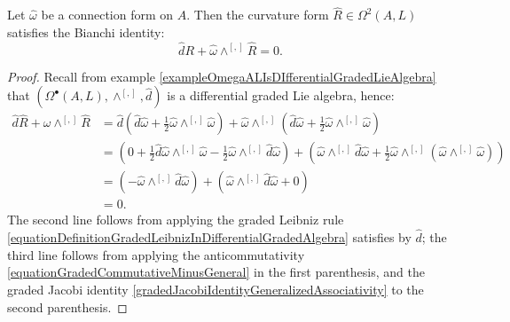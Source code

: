 \begin{proposition}\label{propositionCurvatureSatisfiesBianchi}
Let $\hat \omega$ be a connection form on $A$. Then the curvature form $\hat R \in \Omega^2(A, L)$ satisfies the Bianchi identity:
\begin{equation}
    \hat d R + \hat \omega \wedge^{[,]} \hat R = 0.
\end{equation}
\end{proposition}
\begin{proof}
Recall from example \ref{exampleOmegaALIsDIfferentialGradedLieAlgebra} that $(\Omega^\bullet(A, L), \wedge^{[,]}, \hat d)$ is a differential graded Lie algebra, hence:
\begin{align*}
    \hat d \hat  R + \hat \omega \wedge^{[,]} \hat R 
        &= \hat d(\hat d \hat \omega + \frac{1}{2}\hat \omega \wedge^{[,]} \hat \omega) + \hat \omega \wedge^{[,]} (\hat d \hat \omega + \frac{1}{2} \hat \omega \wedge^{[,]} \hat \omega) \\
        &= (0 + \frac{1}{2} \hat d \hat \omega \wedge^{[,]} \hat \omega - \frac{1}{2} \hat \omega \wedge^{[,]} \hat d \hat \omega) + (\hat \omega \wedge^{[,]} \hat d \hat \omega + \frac{1}{2} \hat \omega \wedge^{[,]} (\hat \omega \wedge^{[,]} \hat \omega)) \\
        &= (- \hat \omega \wedge^{[,]} \hat d \hat \omega) + (\hat \omega \wedge^{[,]} \hat d \hat \omega + 0) \\
        &= 0.
\end{align*}
The second line follows from applying the graded Leibniz rule \eqref{equationDefinitionGradedLeibnizInDifferentialGradedAlgebra} satisfies by $\hat d$; the third line follows from applying the anticommutativity \eqref{equationGradedCommutativeMinusGeneral} in the first parenthesis, and the graded Jacobi identity \eqref{gradedJacobiIdentityGeneralizedAssociativity} to the second parenthesis.
\end{proof}

